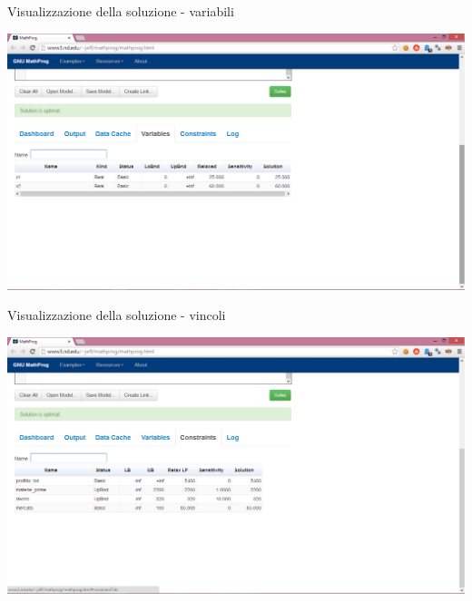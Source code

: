 \documentclass{beamer}
\begin{document}
\begin{frame}{Visualizzazione della soluzione - variabili}
\begin{center}
\includegraphics[height=0.85\textheight]{img/mathprog_jeff_3}
\par\end{center}
\end{frame}

\begin{frame}{Visualizzazione della soluzione - vincoli}
\begin{center}
\includegraphics[height=0.85\textheight]{img/mathprog_jeff_4}
\par\end{center}
\end{frame}
\end{document}
